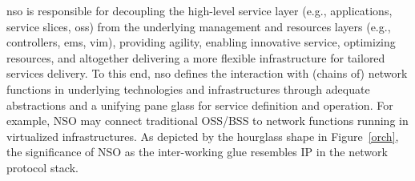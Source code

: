 \gls{nso} is responsible for decoupling the high-level service layer (e.g., applications, service  slices, \gls{oss}) from the underlying management and resources layers (e.g., controllers, \gls{ems}, \gls{vim}), providing agility, enabling innovative service, optimizing resources, and altogether delivering a more flexible infrastructure for tailored services delivery. To this end, \gls{nso}  defines the interaction with (chains of) network functions in underlying technologies and infrastructures through adequate abstractions and a unifying pane glass for service definition and operation. For example, NSO may connect traditional OSS/BSS to network functions running in virtualized infrastructures. As depicted by the hourglass shape in Figure~\ref{orch}, the  significance of NSO as the inter-working glue resembles IP in the network protocol stack. %


